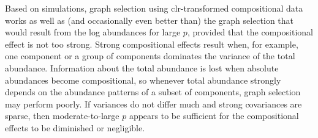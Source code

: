 \documentclass[10pt]{article}
\begin{document}
Based on simulations, graph selection using clr-transformed compositional data works as well as (and occasionally even better than) the graph selection that would result from the log abundances for large $p$, provided that the compositional effect is not too strong. Strong compositional effects result when, for example, one component or a group of components dominates the variance of the total abundance. Information about the total abundance is lost when absolute abundances become compositional, so whenever total abundance strongly depends on the abundance patterns of a subset of components, graph selection may perform poorly. If variances do not differ much and strong covariances are sparse, then moderate-to-large $p$ appears to be sufficient for the compositional effects to be diminished or negligible.

\pagebreak


\end{document}
